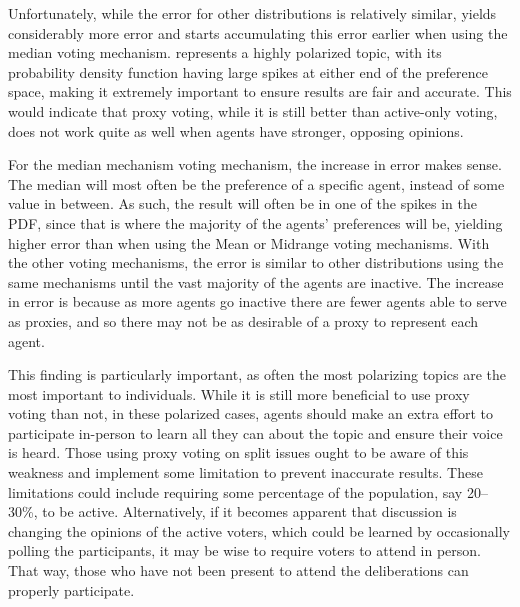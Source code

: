 Unfortunately, while the error for other distributions is relatively similar,
 yields considerably more error and starts accumulating
this error earlier when using the median voting mechanism.
 represents a highly polarized topic, with its probability
density function having large spikes at either end of the preference space, making it
extremely important to ensure results are fair and accurate.
This would indicate that proxy voting, while it is still better than active-only
voting, does not work quite as well when agents have stronger, opposing opinions.

For the median mechanism voting mechanism, the increase in error makes sense.
The median will most often be the preference of a specific agent, instead of some
value in between.
As such, the result will often be in one of the spikes in the PDF, since that is
where the majority of the agents' preferences will be, yielding higher error than when
using the Mean or Midrange voting mechanisms.
With the other voting mechanisms, the error is similar to other distributions using
the same mechanisms until the vast majority of the agents are inactive.
The increase in error is because as more agents go inactive there are fewer agents able
to serve as proxies, and so there may not be as desirable of a proxy to represent
each agent.

This finding is particularly important, as often the most polarizing topics are the
most important to individuals.
While it is still more beneficial to use proxy voting than not, in these polarized
cases, agents should make an extra effort to participate in-person to learn all they
can about the topic and ensure their voice is heard.
Those using proxy voting on split issues ought to be aware of this weakness and
implement some limitation to prevent inaccurate results.
These limitations could include requiring some percentage of the population, say
20--30\%, to be active.
Alternatively, if it becomes apparent that discussion is changing the opinions of the
active voters, which could be learned by occasionally polling the participants, it
may be wise to require voters to attend in person.
That way, those who have not been present to attend the deliberations can properly
participate.

